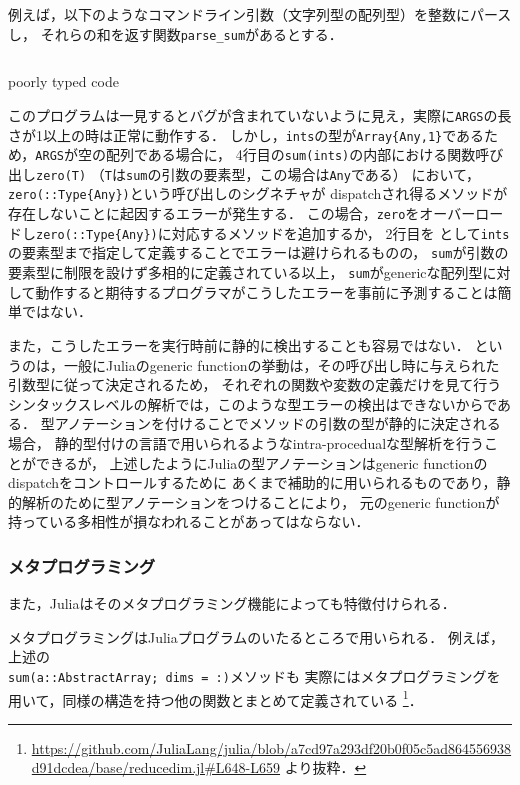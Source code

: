 例えば，以下のようなコマンドライン引数（文字列型の配列型）を整数にパースし，
それらの和を返す関数\verb|parse_sum|があるとする．

\begin{listing}[ht]
  \inputminted[frame=lines]{julia}{src/parse_sum.jl}
  \caption{poorly typed code}
  \label{lst:target1}
\end{listing}

このプログラムは一見するとバグが含まれていないように見え，実際に\verb|ARGS|の長さが1以上の時は正常に動作する．
しかし，\verb|ints|の型が\verb|Array{Any,1}|であるため，\verb|ARGS|が空の配列である場合に，
4行目の\verb|sum(ints)|の内部における関数呼び出し\verb|zero(T)|
（\verb|T|は\verb|sum|の引数の要素型，この場合は\verb|Any|である）
において， \verb|zero(::Type{Any})|という呼び出しのシグネチャが
dispatchされ得るメソッドが存在しないことに起因するエラーが発生する．
この場合，\verb|zero|をオーバーロードし\verb|zero(::Type{Any})|に対応するメソッドを追加するか，
2行目を  として\verb|ints|の要素型まで指定して定義することでエラーは避けられるものの，
\verb|sum|が引数の要素型に制限を設けず多相的に定義されている以上，
\verb|sum|がgenericな配列型に対して動作すると期待するプログラマがこうしたエラーを事前に予測することは簡単ではない．

また，こうしたエラーを実行時前に静的に検出することも容易ではない．
というのは，一般にJuliaのgeneric functionの挙動は，その呼び出し時に与えられた引数型に従って決定されるため，
それぞれの関数や変数の定義だけを見て行うシンタックスレベルの解析では，このような型エラーの検出はできないからである．
型アノテーションを付けることでメソッドの引数の型が静的に決定される場合，
静的型付けの言語で用いられるようなintra-procedualな型解析を行うことができるが，
上述したようにJuliaの型アノテーションはgeneric functionのdispatchをコントロールするために
あくまで補助的に用いられるものであり，静的解析のために型アノテーションをつけることにより，
元のgeneric functionが持っている多相性が損なわれることがあってはならない．

\subsubsection{メタプログラミング} \label{subsubsection:metaprogramming}

また，Juliaはそのメタプログラミング機能によっても特徴付けられる．

メタプログラミングはJuliaプログラムのいたるところで用いられる．
例えば，上述の\\\verb|sum(a::AbstractArray; dims = :)|メソッドも
実際にはメタプログラミングを用いて，同様の構造を持つ他の関数とまとめて定義されている
\footnote{
  \url{https://github.com/JuliaLang/julia/blob/a7cd97a293df20b0f05c5ad864556938d91dcdea/base/reducedim.jl\#L648-L659}
  より抜粋．
}．

